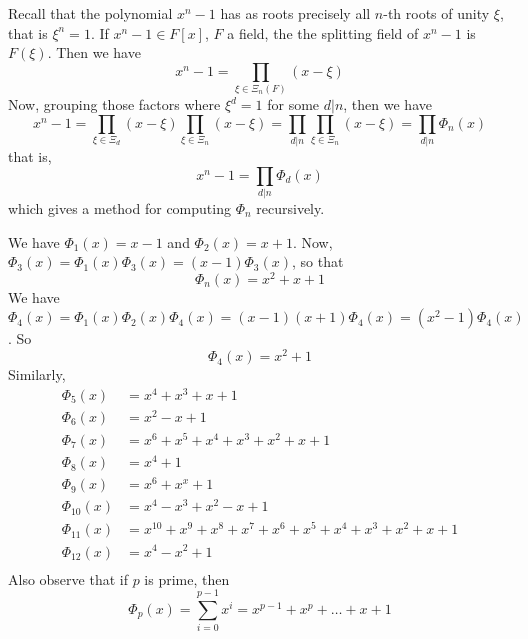 \begin{example}\label{8.18}
  Recall that the polynomial $x^n-1$ has as roots precisely all  $n$-th roots
  of unity  $\xi$, that is $\xi^n=1$. If $x^n-1 \in F[x]$, $F$ a field, the
  the splitting field of  $x^n-1$ is  $F(\xi)$. Then we have
  \begin{equation*}
    x^n-1=\prod_{\xi \in \Xi_n(F)}{(x-\xi)}
  \end{equation*}
  Now, grouping those factors where $\xi^d=1$ for some  $d|n$, then we have
  \begin{equation*}
    x^n-1=\prod_{\xi \in \Xi_d}{(x-\xi)}\prod_{\xi \in \Xi_n}{(x-\xi)}=
    \prod_{d|n}{\prod_{\xi \in \Xi_n}{(x-\xi)}}=\prod_{d|n}{\Phi_n(x)}
  \end{equation*}
  that is,
  \begin{equation*}
    x^n-1=\prod_{d|n}{\Phi_d(x)}
  \end{equation*}
  which gives a method for computing $\Phi_n$ recursively.

  We have  $\Phi_1(x)=x-1$ and $\Phi_2(x)=x+1$. Now,
  $\Phi_3(x)=\Phi_1(x)\Phi_3(x)=(x-1)\Phi_3(x)$, so that
  \begin{equation*}
    \Phi_n(x)=x^2+x+1
  \end{equation*}
  We have
  $\Phi_4(x)=\Phi_1(x)\Phi_2(x)\Phi_4(x)=(x-1)(x+1)\Phi_4(x)=(x^2-1)\Phi_4(x)$.
  So
  \begin{equation*}
    \Phi_4(x)=x^2+1
  \end{equation*}
  Similarly,
  \begin{align*}
    \Phi_5(x)   &=  x^4+x^3+x+1 \\
    \Phi_6(x)   &=  x^2-x+1 \\
    \Phi_7(x)   &=  x^6+x^5+x^4+x^3+x^2+x+1 \\
    \Phi_8(x)   &= x^4+1    \\
    \Phi_9(x)   &=  x^6+x^x+1   \\
    \Phi_{10}(x)   &=   x^4-x^3+x^2-x+1 \\
    \Phi_{11}(x)   &=   x^{10}+x^9+x^8+x^7+x^6+x^5+x^4+x^3+x^2+x+1  \\
    \Phi_{12}(x)   &=   x^4-x^2+1   \\
  \end{align*}
  Also observe that if $p$ is prime, then
  \begin{equation*}
    \Phi_p(x)=\sum_{i=0}^{p-1}{x^i}=x^{p-1}+x^p+\dots+x+1
  \end{equation*}
\end{example}

